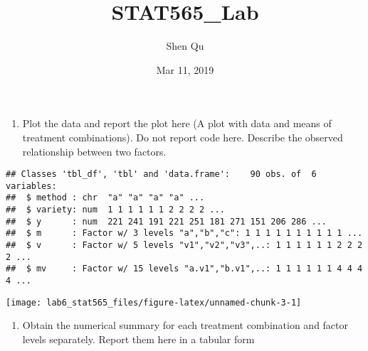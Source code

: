 \documentclass[]{article}
\title{STAT565\_Lab}
\author{Shen Qu}
\date{Mar 11, 2019}
\providecommand{\tightlist}{%
  \setlength{\itemsep}{0pt}\setlength{\parskip}{0pt}}
\begin{document}
\maketitle

\begin{enumerate}
\def\labelenumi{(\alph{enumi})}
\tightlist
\item
  \textcolor[rgb]{0.5,0.5,0.5}{Plot the data and report the plot here (A plot with data and means of treatment combinations). Do not report code here. Describe the observed relationship between two factors.}
\end{enumerate}

\begin{verbatim}
## Classes 'tbl_df', 'tbl' and 'data.frame':    90 obs. of  6 variables:
##  $ method : chr  "a" "a" "a" "a" ...
##  $ variety: num  1 1 1 1 1 1 2 2 2 2 ...
##  $ y      : num  221 241 191 221 251 181 271 151 206 286 ...
##  $ m      : Factor w/ 3 levels "a","b","c": 1 1 1 1 1 1 1 1 1 1 ...
##  $ v      : Factor w/ 5 levels "v1","v2","v3",..: 1 1 1 1 1 1 2 2 2 2 ...
##  $ mv     : Factor w/ 15 levels "a.v1","b.v1",..: 1 1 1 1 1 1 4 4 4 4 ...
\end{verbatim}

\texttt{[image: lab6\_stat565\_files/figure-latex/unnamed-chunk-3-1]}

\begin{enumerate}
\def\labelenumi{(\alph{enumi})}
\setcounter{enumi}{1}
\tightlist
\item
  \textcolor[rgb]{0.5,0.5,0.5}{Obtain the numerical summary for each treatment combination and factor levels separately. Report them here in a tabular form}
\end{enumerate}
\end{document}
